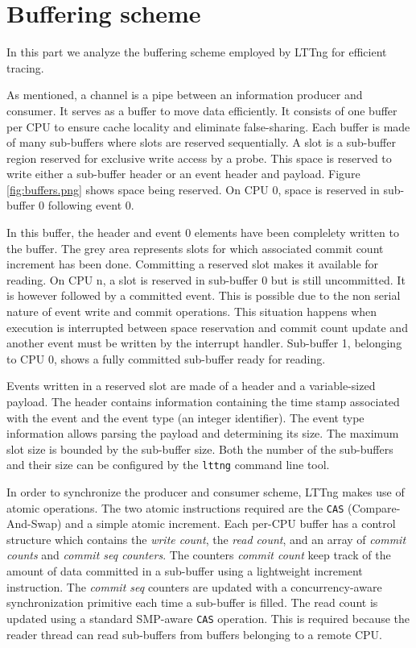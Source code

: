 \section{Buffering scheme}\label{sec:buffers}

In this part we analyze the buffering scheme employed by LTTng for efficient
tracing.

As mentioned, a channel is a pipe between an information producer and consumer.
It serves as a buffer to move data efficiently. It consists of one buffer per
CPU to ensure cache locality and eliminate false-sharing. Each buffer is made of
many sub-buffers where slots are reserved sequentially.  A slot is a sub-buffer
region reserved for exclusive write access by a probe.  This space is reserved
to write either a sub-buffer header or an event header and payload. Figure
\ref{fig:buffers.png} shows space being reserved. On CPU 0, space is reserved in
sub-buffer 0 following event 0. 


In this buffer, the header and event 0 elements have been complelety written to
the buffer. The grey area represents slots for which associated commit count
increment has been done. Committing a reserved slot makes it available for
reading. On CPU n, a slot is reserved in sub-buffer 0 but is still uncommitted.
It is however followed by a committed event. This is possible due to the non
serial nature of event write and commit operations. This situation happens when
execution is interrupted between space reservation and commit count update and
another event must be written by the interrupt handler.  Sub-buffer 1, belonging
to CPU 0, shows a fully committed sub-buffer ready for reading.


Events written in a reserved slot are made of a header and a variable-sized
payload. The header contains information containing the time stamp associated
with the event and the event type (an integer identifier). The event type
information allows parsing the payload and determining its size. The maximum
slot size is bounded by the sub-buffer size. Both the number of the sub-buffers
and their size can be configured by the \texttt{lttng} command line tool.

In order to synchronize the producer and consumer scheme, LTTng makes use of
atomic operations. The two atomic instructions required are the \texttt{CAS}
(Compare-And-Swap) and a simple atomic increment. Each per-CPU buffer has a
control structure which contains the \textit{write count}, the \textit{read
count}, and an array of \textit{commit counts} and \textit{commit seq counters}.
The counters \textit{commit count} keep track of the amount of data committed in
a sub-buffer using a lightweight increment instruction. The \textit{commit seq}
counters are updated with a concurrency-aware synchronization primitive each
time a sub-buffer is filled. The read count is updated using a standard
SMP-aware \texttt{CAS} operation. This is required because the reader thread can
read sub-buffers from buffers belonging to a remote CPU.

